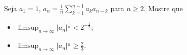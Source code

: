 Seja \(a_{1}=1\), \(a_{n}=\frac{1}{n} \sum_{k=1}^{n-1}a_{k}a_{n-k}\) para \(n\geq 2\). Mostre que
\begin{itemize}
\item[(a)] \(\limsup_{n\to \infty} |a_{n}|^{\frac{1}{n}}<2^{-\frac{1}{2}}\);
\item[(b)] \(\limsup_{n\to \infty} |a_{n}|^{\frac{1}{n}}\geq \frac{2}{3}\).
\end{itemize}
